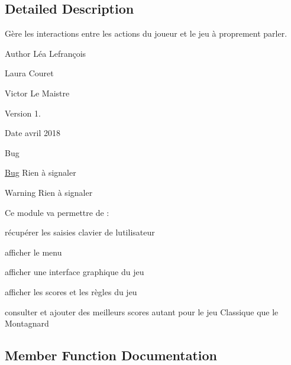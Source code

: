 \subsection{Detailed Description}
Gère les interactions entre les actions du joueur et le jeu à proprement parler. 

\begin{DoxyAuthor}{Author}
Léa Lefrançois 

Laura Couret 

Victor Le Maistre 
\end{DoxyAuthor}
\begin{DoxyVersion}{Version}
1. 
\end{DoxyVersion}
\begin{DoxyDate}{Date}
avril 2018 
\end{DoxyDate}
\begin{DoxyRefDesc}{Bug}
\item[\hyperlink{bug__bug000003}{Bug}]Rien à signaler \end{DoxyRefDesc}
\begin{DoxyWarning}{Warning}
Rien à signaler
\end{DoxyWarning}
Ce module va permettre de \+:
\begin{DoxyItemize}
\item récupérer les saisies clavier de l\textquotesingle{}utilisateur
\item afficher le menu
\item afficher une interface graphique du jeu
\item afficher les scores et les règles du jeu
\item consulter et ajouter des meilleurs scores autant pour le jeu Classique que le Montagnard 
\end{DoxyItemize}

\subsection{Member Function Documentation}
\mbox{\label{classIHM_a48abb3aee5c33a71f6fc2c3528f99afb}} 
